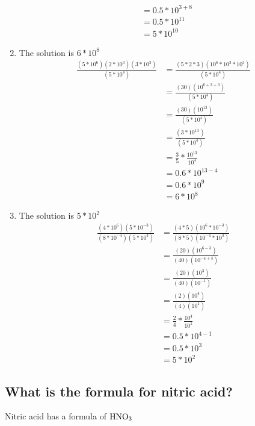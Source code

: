 \documentclass[11pt]{article}
\begin{document}
\begin{enumerate}
\begin{align*}
&=0.5*10^{3+8}\\
&=0.5*10^11\\
&=5*10^{10}
\end{align*}
\item The solution is \(6*10^8\)
\begin{align*}
\frac{(5*10^6)(2*10^3)(3*10^3)}{(5*10^4)}&=\frac{(5*2*3)(10^6*10^3*10^3)}{(5*10^4)}\\
&=\frac{(30)(10^{6+3+3})}{(5*10^4)}\\
&=\frac{(30)(10^{12}^{})}{(5*10^4)}\\
&=\frac{(3*10^{13}^{}^{})}{(5*10^4)}\\
&=\frac{3}{5}*\frac{10^{13}}{10^4}\\
&=0.6*10^{13-4}\\
&=0.6*10^9\\
&=6*10^8
\end{align*}
\item The solution is \(5*10^2^{}\)
\begin{align*}
\frac{(4*10^6)(5*10^{-3})}{(8*10^{-4})(5*10^3)}&=\frac{(4*5)(10^6*10^{-3})}{(8*5)(10^{-4}*10^3)}\\
&=\frac{(20)(10^{6-3}^{})}{(40)(10^{-4+3})}\\
&=\frac{(20)(10^3^{})}{(40)(10^{-1})}^{}\\
&=\frac{(2)(10^4^{})}{(4)(10^1)}^{}\\
&=\frac{2}{4}*\frac{10^4}{10^1}\\
&=0.5*10^{4-1}\\
&=0.5*10^3\\
&=5*10^2
\end{align*}
\end{enumerate}

\subsection{What is the formula for nitric acid?}
\label{sec:org8450154}
Nitric acid has a formula of \(\ce{HNO3}\)
\end{document}
